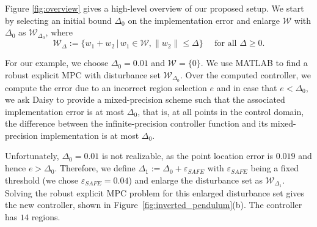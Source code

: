 
	
Figure \ref{fig:overview} gives a high-level overview of our proposed setup.
We start by selecting an initial bound $\Delta_0$ on the implementation error and enlarge $\mathcal W$ with $\Delta_0$ as $\mathcal W_{\Delta_0}$, where
\begin{equation}
\mathcal W_{\Delta} := \{w_1+w_2 \,|\, w_1\in \mathcal W, \|w_2\|\le \Delta\}
\quad\text{ for all } \Delta\ge 0.
\end{equation}
 
For our example, we choose $\Delta_0=0.01$ and $\mathcal W = \{0\}$. 
We use MATLAB to find a robust explicit MPC with disturbance set $\mathcal W_{\Delta_0}$. Over the computed controller, we compute the error due to an incorrect region selection $e$ and in case that $e<\Delta_0$, we ask Daisy
to provide a mixed-precision scheme such that the associated implementation error is at most $\Delta_0$, that is,
at all points in the control domain, the difference between the infinite-precision controller function
and its mixed-precision implementation is at most $\Delta_0$.


Unfortunately, $\Delta_0=0.01$ is not realizable, as the point location error is $0.019$ and hence $e>\Delta_0$. 
Therefore, we define $\Delta_1 := \Delta_0 + \varepsilon_{SAFE}$ with $\varepsilon_{SAFE}$ being a fixed threshold (we chose $\varepsilon_{SAFE} = 0.04$) and enlarge the disturbance set as $\mathcal W_{\Delta_1}$. 
Solving the robust explicit MPC problem for this enlarged disturbance set gives the new controller,
shown in Figure~\ref{fig:inverted_pendulum}(b).
The controller has $14$ regions.

